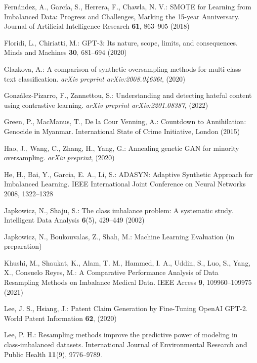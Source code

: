 \documentclass[runningheads]{llncs}
\begin{document}
\begin{thebibliography}{31}
Fernández, A., García, S., Herrera, F., Chawla, N. V.: SMOTE for Learning from Imbalanced Data: Progress and Challenges, Marking the 15-year Anniversary. Journal of Artificial Intelligence Research \textbf{61}, 863--905 (2018)

Floridi, L., Chiriatti, M.: GPT-3: Its nature, scope, limits, and consequences. Minds and Machines \textbf{30}, 681--694 (2020)

Glazkova, A.: A comparison of synthetic oversampling methods for multi-class text classification. \emph{arXiv preprint arXiv:2008.04636t}, (2020)

González-Pizarro, F., Zannettou, S.: Understanding and detecting hateful content using contrastive learning. \emph{arXiv preprint arXiv:2201.08387}, (2022)

Green, P., MacManus, T., De la Cour Venning, A.: Countdown to Annihilation: Genocide in Myanmar. International State of Crime Initiative, London (2015)

Hao, J., Wang, C., Zhang, H., Yang, G.: Annealing genetic GAN for minority oversampling. \emph{arXiv preprint}, (2020)

He, H., Bai, Y., Garcia, E. A., Li, S.: ADASYN: Adaptive Synthetic Approach for Imbalanced Learning. IEEE International Joint Conference on Neural Networks 2008, 1322--1328

Japkowicz, N., Shaju, S.: The class imbalance problem: A systematic study. Intelligent Data Analysis \textbf{6}(5), 429--449 (2002)

Japkowicz, N., Boukouvalas, Z., Shah, M.: Machine Learning Evaluation (in preparation)

Khushi, M., Shaukat, K., Alam, T. M., Hammed, I. A., Uddin, S., Luo, S., Yang, X., Consuelo Reyes, M.: A Comparative Performance Analysis of Data Resampling Methods on Imbalance Medical Data. IEEE Access \textbf{9}, 109960--109975 (2021)

Lee, J. S., Hsiang, J.: Patent Claim Generation by Fine-Tuning OpenAI GPT-2. World Patent Information \textbf{62}, (2020)

Lee, P. H.: Resampling methods improve the predictive power of modeling in class-imbalanced datasets. International Journal of Environmental Research and Public Health \textbf{11}(9), 9776--9789.


\end{thebibliography}
\end{document}
